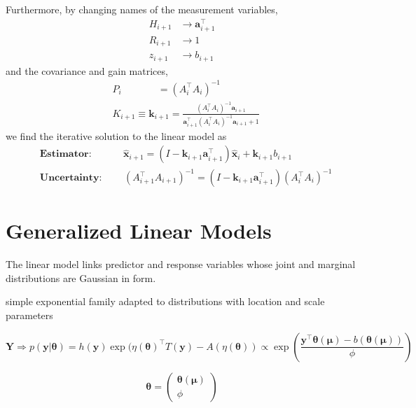 \documentclass[12pt, twoside, draft]{article}
\begin{document}
Furthermore, by changing names of the measurement variables,
\begin{align}
H_{i+1} &\rightarrow \mathbf{a}_{i+1}^\top \\
R_{i+1} &\rightarrow 1 \\
z_{i+1} &\rightarrow b_{i+1}
\end{align}
and the covariance and gain matrices,
\begin{align}
&P_i \hspace{44pt}= (A_i^\top A_i)^{-1} \\
&K_{i+1} \equiv \mathbf{k}_{i+1} =  \frac{(A_i^\top A_i)^{-1} \mathbf{a}_{i+1}}{\mathbf{a}_{i+1}^\top (A_i^\top A_i)^{-1} \mathbf{a}_{i+1} + 1}
\end{align}
we find the iterative solution to the linear model as
\begin{align}
&\textbf{Estimator:} \hspace{39pt}  \hat{\mathbf{x}}_{i+1} = \left( I - \mathbf{k}_{i+1} \mathbf{a}_{i+1}^\top \right) \hat{\mathbf{x}}_i + \mathbf{k}_{i+1} b_{i+1} \\
&\textbf{Uncertainty:} \hspace{27pt} \left(A_{i+1}^\top A_{i+1} \right)^{-1} = \left( I - \mathbf{k}_{i+1} \mathbf{a}_{i+1}^\top \right) \left(A_i^\top A_i \right)^{-1} 
\end{align}

\section{Generalized Linear Models}\label{sec:generalized_linear_models}
The linear model links predictor and response variables whose joint and marginal distributions are Gaussian in form.



simple exponential family adapted to distributions with location and scale parameters

\begin{equation}
\mathbf{Y} \Rightarrow p(\mathbf{y} | \boldsymbol{\theta} ) = h(\mathbf{y}) \exp (\eta(\boldsymbol{\theta})^\top T(\mathbf{y}) - A(\eta(\boldsymbol{\theta})) \propto \exp \left( \frac{\mathbf{y}^\top \boldsymbol{\theta}(\boldsymbol{\mu}) - b(\boldsymbol{\theta}(\boldsymbol{\mu}))}{\phi} \right)
\end{equation}

\begin{equation}
\boldsymbol{\theta} = \begin{pmatrix} \boldsymbol{\theta}(\boldsymbol{\mu}) \\ \phi \end{pmatrix}
\end{equation}
\end{document}

